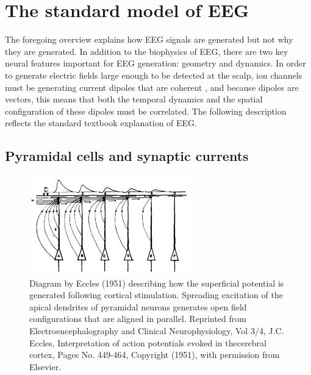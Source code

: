 \section{The standard model of EEG} \label{sec:standard_model}

The foregoing overview explains how EEG signals are generated but not why they are generated. In addition to the biophysics of EEG, there are two key neural features important for EEG generation: geometry and dynamics. In order to generate electric fields large enough to be detected at the scalp, ion channels must be generating current dipoles that are coherent \cite{Buzsaki2012, Nunez2006}, and because dipoles are vectors, this means that both the temporal dynamics and the spatial configuration of these dipoles must be correlated. The following description reflects the standard textbook explanation of EEG.

\subsection{Pyramidal cells and synaptic currents}


\begin{figure}
\vspace{-10pt}
\includegraphics[width=70mm]{Figures/chapter1/Eccles_1951.png}
\caption{  Diagram by Eccles (1951) describing how the superficial potential is generated following cortical stimulation. Spreading excitation of the apical dendrites of pyramidal neurons generates open field configurations that are aligned in parallel. Reprinted from Electroencephalography and Clinical Neurophysiology, Vol 3/4, J.C. Eccles, Interpretation of action potentials evoked in thecerebral cortex, Pages No. 449-464, Copyright (1951), with permission from Elsevier.
} \label{fig:eccles}
\end{figure}

